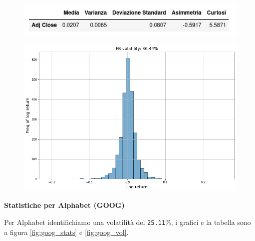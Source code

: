 \documentclass{article}
\begin{document}
\begin{figure}[h]
  \centering
  \begin{minipage}{.5\textwidth}
    \centering
    \vspace{4.35cm}
    \includegraphics[width=1\linewidth]{meta_stats.png}
    \label{fig:fb_stats}
  \end{minipage}%
  \begin{minipage}{.5\textwidth}
    \centering
    \includegraphics[width=1\linewidth]{meta_volatility.png}
    \label{fig:fb_vol}
  \end{minipage}
\end{figure}

\textbf{Statistiche per Alphabet (GOOG)}

Per Alphabet identifichiamo una volatilità del \verb|25.11|\%, i grafici e la tabella sono a figura \ref{fig:goog_stats} e \ref{fig:goog_vol}.
\end{document}
